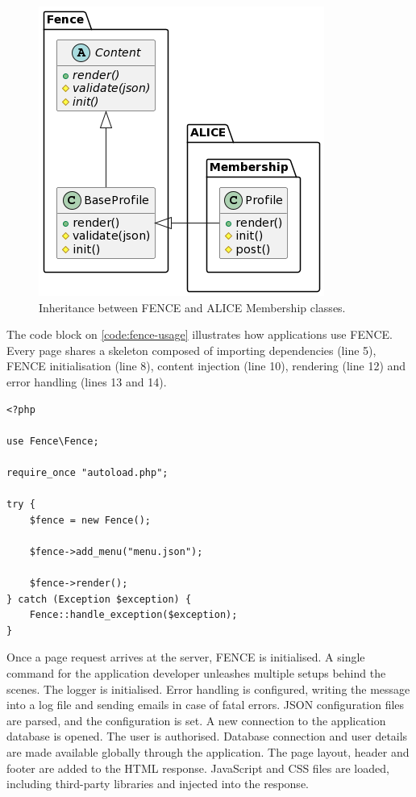 \begin{figure}[htbp]
  \centering
  \includegraphics[scale=0.7]{Imagens/chap02/fence-class-diagram.png}
  \caption{Inheritance between FENCE and ALICE Membership classes.}
  \label{fig:fence-inheritance}
\end{figure}

The code block on \autoref{code:fence-usage} illustrates how applications use FENCE. Every page shares a skeleton composed of importing dependencies (line 5), FENCE initialisation (line 8), content injection (line 10), rendering (line 12) and error handling (lines 13 and 14).

\begin{listing}
\begin{verbatim}
<?php

use Fence\Fence;

require_once "autoload.php";

try {
    $fence = new Fence();
    
    $fence->add_menu("menu.json");
    
    $fence->render();
} catch (Exception $exception) {
    Fence::handle_exception($exception);
}
\end{verbatim}
\caption{FENCE usage example.}
\label{code:fence-usage}
\end{listing}

Once a page request arrives at the server, FENCE is initialised. A single command for the application developer unleashes multiple setups behind the scenes. The logger is initialised. Error handling is configured, writing the message into a log file and sending emails in case of fatal errors. JSON configuration files are parsed, and the configuration is set. A new connection to the application database is opened. The user is authorised. Database connection and user details are made available globally through the application. The page layout, header and footer are added to the HTML response. JavaScript and CSS files are loaded, including third-party libraries and injected into the response.

